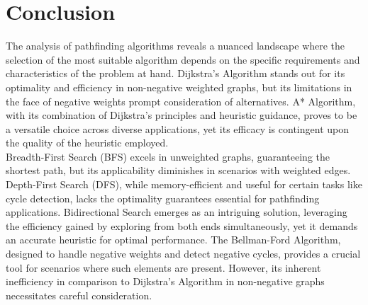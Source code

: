 \documentclass[a4paper, 12pt]{article}
\begin{document}
	
	
	
	
	
	\newpage
	\section*{Conclusion}
	\label{sec:conclusion}
	The analysis of pathfinding algorithms reveals a nuanced landscape where the selection of the most suitable algorithm depends on the specific requirements and characteristics of the problem at hand. Dijkstra's Algorithm stands out for its optimality and efficiency in non-negative weighted graphs, but its limitations in the face of negative weights prompt consideration of alternatives. A* Algorithm, with its combination of Dijkstra's principles and heuristic guidance, proves to be a versatile choice across diverse applications, yet its efficacy is contingent upon the quality of the heuristic employed.\\
	
	Breadth-First Search (BFS) excels in unweighted graphs, guaranteeing the shortest path, but its applicability diminishes in scenarios with weighted edges. Depth-First Search (DFS), while memory-efficient and useful for certain tasks like cycle detection, lacks the optimality guarantees essential for pathfinding applications. Bidirectional Search emerges as an intriguing solution, leveraging the efficiency gained by exploring from both ends simultaneously, yet it demands an accurate heuristic for optimal performance. The Bellman-Ford Algorithm, designed to handle negative weights and detect negative cycles, provides a crucial tool for scenarios where such elements are present. However, its inherent inefficiency in comparison to Dijkstra's Algorithm in non-negative graphs necessitates careful consideration.\\
	
\end{document}
